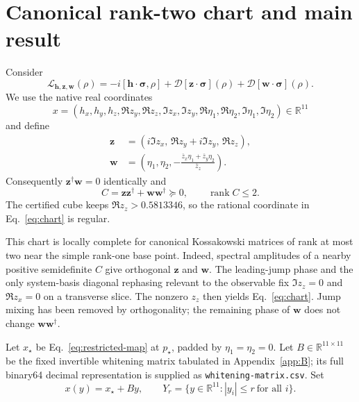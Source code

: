 \documentclass[11pt,a4paper]{article}
\newcommand{\cL}{\mathcal{L}}
\newcommand{\cD}{\mathcal{D}}
\newcommand{\R}{\mathbb{R}}
\newcommand{\rank}{\operatorname{rank}}
\begin{document}
\section{Canonical rank-two chart and main result}
\label{sec:chart}

Consider
\begin{equation}
 \cL_{\bm h,\bm z,\bm w}(\rho)
 =-i[\bm h\cdot\bm\sigma,\rho]
 +\cD[\bm z\cdot\bm\sigma](\rho)
 +\cD[\bm w\cdot\bm\sigma](\rho).
 \label{eq:twojump}
\end{equation}
We use the native real coordinates
\begin{equation}
 x=(h_x,h_y,h_z,\Re z_y,\Re z_z,\Im z_x,\Im z_y,
       \Re\eta_1,\Re\eta_2,\Im\eta_1,\Im\eta_2)
 \in\R^{11}
 \label{eq:native-x}
\end{equation}
and define
\begin{align}
 \bm z&=(i\Im z_x,\,\Re z_y+i\Im z_y,\,\Re z_z),\nonumber\\
 \bm w&=\left(\eta_1,\eta_2,
 -\frac{\overline z_x\eta_1+\overline z_y\eta_2}{\overline z_z}\right).
 \label{eq:chart}
\end{align}
Consequently $\bm z^\dagger\bm w=0$ identically and
\begin{equation}
 C=\bm z\bm z^\dagger+\bm w\bm w^\dagger\succeq0,
 \qquad \rank C\leq2.
 \label{eq:C}
\end{equation}
The certified cube keeps $\Re z_z>0.5813346$, so the rational coordinate in
Eq.~\eqref{eq:chart} is regular.

This chart is locally complete for canonical Kossakowski matrices of rank at
most two near the simple rank-one base point.  Indeed, spectral amplitudes of
a nearby positive semidefinite $C$ give orthogonal $\bm z$ and $\bm w$.
The leading-jump phase and the only system-basis diagonal rephasing relevant
to the observable fix $\Im z_z=0$ and $\Re z_x=0$ on a transverse slice.
The nonzero $z_z$ then yields Eq.~\eqref{eq:chart}.  Jump mixing has been
removed by orthogonality; the remaining phase of $\bm w$ does not change
$\bm w\bm w^\dagger$.

Let $x_\star$ be Eq.~\eqref{eq:restricted-map} at $p_\star$, padded by
$\eta_1=\eta_2=0$.  Let $B\in\R^{11\times11}$ be the fixed invertible
whitening matrix tabulated in Appendix~\ref{app:B}; its full binary64 decimal
representation is supplied as \texttt{whitening-matrix.csv}.  Set
\begin{equation}
 x(y)=x_\star+By,\qquad
 Y_r=\{y\in\R^{11}: |y_i|\leq r\ \text{for all }i\}.
 \label{eq:whitened-chart}
\end{equation}
\end{document}
